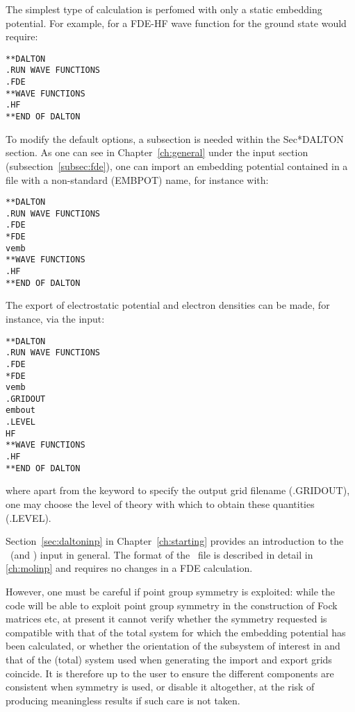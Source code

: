 The simplest type of calculation is perfomed with only a static embedding potential. For example, 
for a FDE-HF wave function for the ground state would require:
\begin{verbatim}
**DALTON
.RUN WAVE FUNCTIONS
.FDE
**WAVE FUNCTIONS
.HF
**END OF DALTON
\end{verbatim}
To modify the default options, a  subsection is needed within the Sec{*DALTON} section.
As one can see in Chapter~\ref{ch:general} under the  input section (subsection~\ref{subsec:fde}),
one can import an embedding potential contained in a file with a non-standard (EMBPOT) name, for instance
with: 
\begin{verbatim}
**DALTON
.RUN WAVE FUNCTIONS
.FDE
*FDE
vemb
**WAVE FUNCTIONS
.HF
**END OF DALTON
\end{verbatim}
The export of electrostatic potential and electron densities can be made, for instance, via the
input:
\begin{verbatim}
**DALTON
.RUN WAVE FUNCTIONS
.FDE
*FDE
vemb
.GRIDOUT
embout
.LEVEL
HF
**WAVE FUNCTIONS
.HF
**END OF DALTON
\end{verbatim}
where apart from the keyword to specify the output grid filename (.GRIDOUT), one may choose the level of theory with which to
obtain these quantities (.LEVEL).  

Section~\ref{sec:daltoninp} in Chapter~\ref{ch:starting} provides an introduction to the \dalton\ (and \molinp) 
input in general. The format of the \molinp\ file is described in detail in \ref{ch:molinp} and requires no
changes in a FDE calculation. 

However, one must be careful if point group symmetry is exploited: while the code will be able to exploit point group 
symmetry in the construction of Fock matrices etc, at present it cannot verify whether the symmetry requested is 
compatible with that of the total system for which the embedding potential has been calculated, or whether  
the orientation of the subsystem of interest in {\dalton} and that of the (total) system used when generating the import 
and export grids coincide. It is therefore up to the user to ensure the different components are consistent
when symmetry is used, or disable it altogether, at the risk of producing meaningless results if such care is not
taken.

